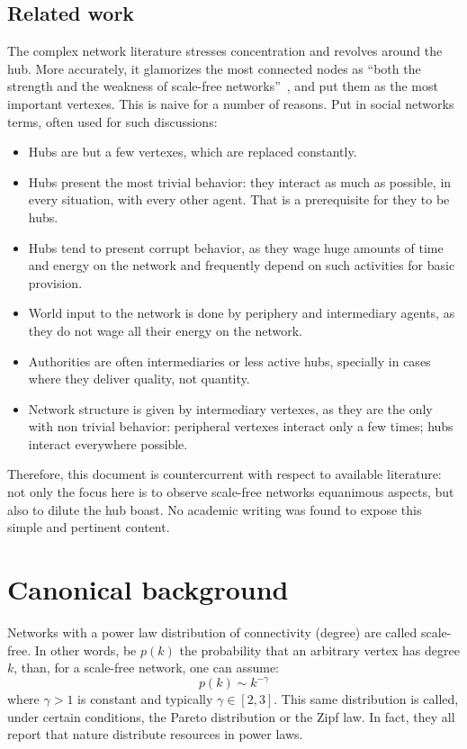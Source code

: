 \documentclass[a4paper, 11pt]{article} %
\begin{document}
\subsection{Related work}\label{sec:rel}
The complex network literature stresses concentration and revolves around the hub. 
More accurately, it glamorizes the most connected nodes as ``both the strength and the weakness of scale-free networks''~\cite{wikipedia}, and put them as the most important vertexes. This is naive for a number of reasons. Put in social networks terms, often used for such discussions:
\begin{itemize}
    \item Hubs are but a few vertexes, which are replaced constantly.
    \item Hubs present the most trivial behavior: they interact as much as possible, in every situation, with every other agent. That is a prerequisite for they to be hubs.
    \item Hubs tend to present corrupt behavior, as they wage huge amounts of time and energy on the network and frequently depend on such activities for basic provision.
    \item World input to the network is done by periphery and intermediary agents, as they do not wage all their energy on the network.
    \item Authorities are often intermediaries or less active hubs, specially in cases where they deliver quality, not quantity.
    \item Network structure is given by intermediary vertexes, as they are the only with non trivial behavior: peripheral vertexes interact only a few times; hubs interact everywhere possible.
\end{itemize}

Therefore, this document is countercurrent with respect to available literature: not only the focus here is to observe scale-free networks equanimous aspects, but also to dilute the hub boast. No academic writing was found to expose this simple and pertinent content.

\section{Canonical background}\label{sec:can}
Networks with a power law distribution of connectivity (degree) are called scale-free. In other words, be $p(k)$ the probability that an arbitrary vertex has degree $k$, than, for a scale-free network, one can assume:
\begin{equation}
p(k) \sim k^{-\gamma}
\end{equation}
\noindent where $\gamma > 1$ is constant and typically $\gamma \in [2,3]$. This same distribution is called, under certain conditions, the Pareto distribution or the Zipf law. In fact, they all report that nature distribute resources in power laws.
\end{document}
